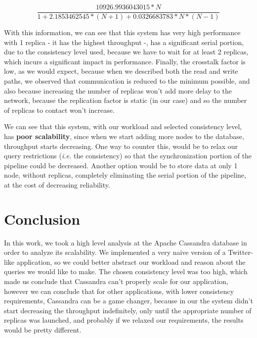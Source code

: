 \documentclass[runningheads]{llncs}
\begin{document}
\[ \frac{10926.9936043015 * N}{1 + 2.1853462545 * (N + 1) +  0.0326683783 * N * (N - 1)} \]

With this information, we can see that this system has very high performance with 1 replica - it has the highest throughput -, has a significant serial portion, due to the consistency level used, because we have to wait for at least 2 replicas, which incurs a significant impact in performance. Finally, the crosstalk factor is low, as we would expect, because when we described both the read and write paths, we observed that communication is reduced to the minimum possible, and also because increasing the number of replicas won't add more delay to the network, because the replication factor is static (in our case) and so the number of replicas to contact won't increase.\par

We can see that this system, with our workload and selected consistency level, has \textbf{poor scalability}, since when we start adding more nodes to the database, throughput starts decreasing. One way to counter this, would be to relax our query restrictions (\emph{i.e.} the consistency) so that the synchronization portion of the pipeline could be decreased. Another option would be to store data at only 1 node, without replicas, completely eliminating the serial portion of the pipeline, at the cost of decreasing reliability.

\section{Conclusion}

In this work, we took a high level analysis at the Apache Cassandra database in order to analyze its scalability. We implemented a very naive version of a Twitter-like application, so we could better abstract our workload and reason about the queries we would like to make. The chosen consistency level was too high, which made us conclude that Cassandra can't properly scale for our application, however we can conclude that for other applications, with lower consistency requirements, Cassandra can be a game changer, because in our the system didn't start decreasing the throughput indefinitely, only until the appropriate number of replicas was launched, and probably if we relaxed our requirements, the results would be pretty different.\par

\printbibliography
\end{document}
